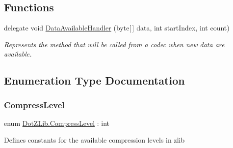 \subsection*{Functions}
\begin{DoxyCompactItemize}
\item 
delegate void \hyperlink{namespace_dot_z_lib_a13a751b897fc2af0be2307e4deb7eb1c}{Data\+Available\+Handler} (byte\mbox{[}$\,$\mbox{]} data, int start\+Index, int count)
\begin{DoxyCompactList}\small\item\em Represents the method that will be called from a codec when new data are available. \end{DoxyCompactList}\end{DoxyCompactItemize}


\subsection{Enumeration Type Documentation}
\mbox{\label{namespace_dot_z_lib_a034f7a1ef9856d8834e6f6b1c53d8a4c}} 
\subsubsection{\texorpdfstring{Compress\+Level}{CompressLevel}\hspace{0.1cm}{\footnotesize\ttfamily [1/2]}}
{\footnotesize\ttfamily enum \hyperlink{namespace_dot_z_lib_a034f7a1ef9856d8834e6f6b1c53d8a4c}{Dot\+Z\+Lib.\+Compress\+Level} \+: int\hspace{0.3cm}{\ttfamily [strong]}}



Defines constants for the available compression levels in zlib 

